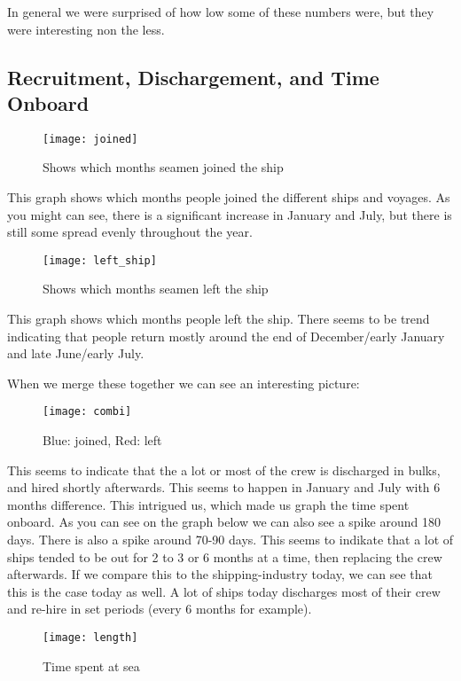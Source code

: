 \documentclass{article}
\begin{document}
In general we were surprised of how low some of these numbers were, but they were interesting non the less.

\subsection{Recruitment, Dischargement, and Time Onboard}

\begin{figure}[H]
	\centering
    \texttt{[image: joined]}
  	\caption{Shows which months seamen joined the ship}
\end{figure}

This graph shows which months people joined the different ships and voyages. As you might can see, there is a significant increase in January and July, but there is still some spread evenly throughout the year.

\begin{figure}[H]
	\centering
	\texttt{[image: left\_ship]}
  	\caption{Shows which months seamen left the ship}
\end{figure}

This graph shows which months people left the ship. There seems to be trend indicating that people return mostly around the end of December/early January and late June/early July.

When we merge these together we can see an interesting picture:

\begin{figure}[H]
	\centering
	\texttt{[image: combi]}
  	\caption{Blue: joined, Red: left}
\end{figure}

This seems to indicate that the a lot or most of the crew is discharged in bulks, and hired shortly afterwards. This seems to happen in January and July with 6 months difference.
This intrigued us, which made us graph the time spent onboard. As you can see on the graph below we can also see a spike around 180 days. There is also a spike around 70-90 days. This seems to indikate that a lot of ships tended to be out for 2 to 3 or 6 months at a time, then replacing the crew afterwards.
If we compare this to the shipping-industry today, we can see that this is the case today as well.
A lot of ships today discharges most of their crew and re-hire in set periods (every 6 months for example).

\begin{figure}[H]
	\centering
	\texttt{[image: length]}
  	\caption{Time spent at sea}
\end{figure}
\end{document}
